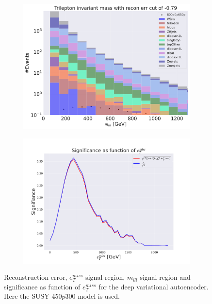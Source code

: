 \begin{figure}[H]
    \hfill
    \begin{subfigure}{.49\textwidth}
        \includegraphics[width=\textwidth]{Figures/VAE_testing/big/3lep/b_data_recon_big_rm3_feats_sig_800p0p050p_mlll_recon_errcut_-0.79.pdf}
        \caption{}
        \label{fig:VAE_3lep_big_mlll_800_2}
    \end{subfigure}
    \hfill   
    \begin{subfigure}{.49\textwidth}
        \includegraphics[width=\textwidth]{Figures/VAE_testing/big/3lep/significance_etmiss_800p0p050p_-0.7941392653620614.pdf}
        \caption{}
        \label{fig:VAE_3lep_big_signi_800_2}
    \end{subfigure}
    \hfill      
    \caption[3lep deep network | $800p50$ | VAE | 2]{Reconstruction error, $e_T^{miss}$ signal region, $m_{lll}$ signal region and significance as function of 
    $e_T^{miss}$ for the deep variational autoencoder. Here the SUSY $450p300$ model is used.}
    \label{fig:VAE_3lep_big_rec_sig_signi_800_2}
\end{figure}

